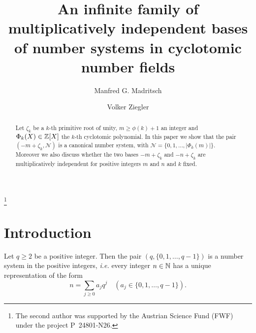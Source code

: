 \theoremstyle{remark}
\newtheorem{remark}{Remark}




\title[Infinite family of bases]
{An infinite family of multiplicatively independent bases of number systems in cyclotomic number fields}

\author[M. G. Madritsch]{Manfred G. Madritsch}
\address{Manfred Madritsch\newline
{}. Universit\'e de Lorraine, Institut Elie Cartan de Lorraine, UMR 7502, Vandoeuvre-l\`es-Nancy, F-54506, France;\newline
{}. CNRS, Institut Elie Cartan de Lorraine, UMR 7502, Vandoeuvre-l\`es-Nancy, F-54506, France}

\author{Volker Ziegler}
\address{Volker Ziegler\newline
\noindent Johann Radon Institute for Computational and Applied Mathematics (RICAM)\newline
\noindent Austrian Academy of Sciences\newline
\noindent Altenbergerstr. 69\newline
\noindent A-4040 Linz, Austria}
\thanks{The second author was supported by the Austrian Science Fund (FWF) under the project P~24801-N26.}

\begin{abstract}
  Let $\zeta_k$ be a $k$-th primitive root of unity, $m\geq\phi(k)+1$ an
  integer and $\Phi_k(X)\in{\mathbb Z}[X]$ the $k$-th cyclotomic polynomial.
  In this paper we show that the pair $(-m+\zeta_k,\mathcal N)$ is a
  canonical number system, with $\mathcal
  N=\{0,1,\dots,|\Phi_k(m)|\}$.  Moreover we also discuss whether the
  two bases $-m+\zeta_k$ and $-n+\zeta_k$ are multiplicatively
  independent for positive integers $m$ and $n$ and $k$ fixed.
\end{abstract}

 

\maketitle

\section{Introduction}
Let $q\geq2$ be a positive integer. Then the pair
$(q,\{0,1,\ldots,q-1\})$ is a number system in the positive integers,
\textit{i.e.} every integer $n\in{\mathbb N}$ has a unique representation of
the form
$$n=\sum_{j\geq0}a_jq^j\quad(a_j\in\{0,1,\ldots,q-1\}).$$

